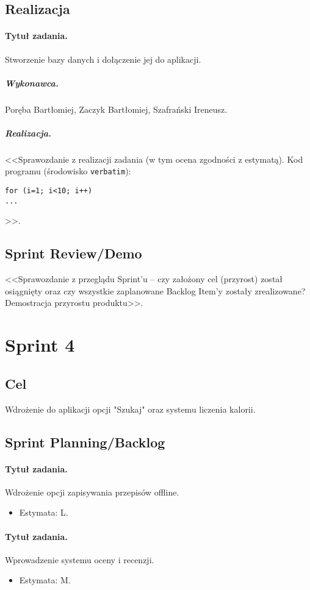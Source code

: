 \documentclass[a4paper]{article}
\begin{document}
\subsection{Realizacja}

\paragraph{Tytuł zadania.}  Stworzenie bazy danych i dołączenie jej do aplikacji.
\subparagraph{Wykonawca.} Poręba Bartłomiej, Zaczyk Bartłomiej, Szafrański Ireneusz.
\subparagraph{Realizacja.} <<Sprawozdanie z realizacji zadania (w tym ocena zgodności z estymatą). Kod programu (środowisko \texttt{verbatim}): \begin{verbatim}
for (i=1; i<10; i++)
...
\end{verbatim}>>.



\subsection{Sprint Review/Demo}
<<Sprawozdanie z przeglądu Sprint'u -- czy założony cel (przyrost) został osiągnięty oraz czy wszystkie zaplanowane Backlog Item'y zostały zrealizowane? Demostracja przyrostu produktu>>.


\section{Sprint 4}

\subsection{Cel} Wdrożenie do aplikacji opcji "Szukaj" oraz systemu liczenia kalorii.

\subsection{Sprint Planning/Backlog}

\paragraph{Tytuł zadania.} Wdrożenie opcji zapisywania przepisów offline.
\begin{itemize}
	\item Estymata: L.
\end{itemize}

\paragraph{Tytuł zadania.} Wprowadzenie systemu oceny i recenzji.
\begin{itemize}
	\item Estymata: M.
\end{itemize}
\end{document}
